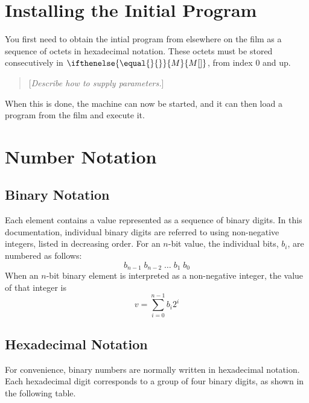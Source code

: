 \documentclass[a4paper,12pt]{article}
\newcommand{\MEM}[1]{\ifthenelse{\equal{#1}{}}{M}{M[#1]}}
\newcommand{\comment}[1]{\begin{quote}[\textit{#1}]\end{quote}}
\begin{document}
\section{Installing the Initial Program}

You first need to obtain the intial program from elsewhere on the film as a sequence of octets in hexadecimal notation.
These octets must be stored consecutively in $\MEM{}$, from index $0$ and up.

\comment{Describe how to supply parameters.}

When this is done, the machine can now be started, and it can then load a program from the film and execute it.

\appendix


\section{Number Notation}
\label{sec:number-notation}

\subsection{Binary Notation}
\label{sec:binary-notation}

Each element contains a value represented as a sequence of binary digits.
In this documentation, individual binary digits are referred to using non-negative integers, listed in decreasing order.
For an $n$-bit value, the individual bits, $b_i$, are numbered as follows:
\[ b_{n-1} \; b_{n-2} \; \ldots \; b_{1} \; b_{0} \]
When an $n$-bit binary element is interpreted as a non-negative integer, the value of that integer is
\[
    v = \sum_{i=0}^{n-1} b_{i}2^{i}
\]

\subsection{Hexadecimal Notation}
\label{sec:hexadecimal-notation}

For convenience, binary numbers are normally written in hexadecimal notation.
Each hexadecimal digit corresponds to a group of four binary digits, as shown in the following table.
\end{document}
